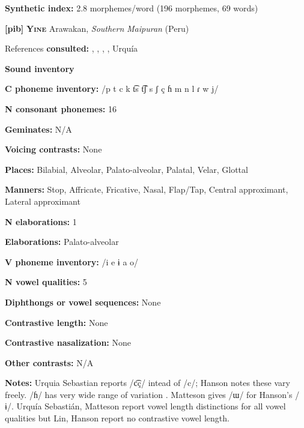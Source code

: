 \textbf{Synthetic index:} 2.8 morphemes/word (196 morphemes, 69 words)



\textbf{[pib]}   \textbf{\textsc{Yine}}  Arawakan, \textit{Southern} \textit{Maipuran} (Peru)



References \textbf{consulted:} \citet{Hanson2010}, \citet{Lin1997}, \citet{Matteson1965}, \citet{Parker1989}, Urquía \citet{SebastiánMarlett2008}



\textbf{Sound inventory}



\textbf{C phoneme inventory:} /p t c k t͡s t͡ʃ s ʃ ç ɦ m n l ɾ w j/



\textbf{N consonant phonemes:} 16



\textbf{Geminates:} N/A



\textbf{Voicing contrasts:} None



\textbf{Places:} Bilabial, Alveolar, Palato-alveolar, Palatal, Velar, Glottal



\textbf{Manners:} Stop, Affricate, Fricative, Nasal, Flap/Tap, Central approximant, Lateral approximant



\textbf{N elaborations:} 1



\textbf{Elaborations:} Palato-alveolar



\textbf{V phoneme inventory:} /i e ɨ a o/



\textbf{N vowel qualities:} 5



\textbf{Diphthongs or vowel sequences:} None



\textbf{Contrastive length:} None



\textbf{Contrastive nasalization:} None



\textbf{Other contrasts:} N/A



\textbf{Notes:} Urquia Sebastian reports /c͡ç/ intead of /c/; Hanson notes these vary freely. /ɦ/ has very wide range of variation \citep[20-23]{Hanson2010}. Matteson gives /ɯ/ for Hanson’s /ɨ/. Urquía Sebastián, Matteson report vowel length distinctions for all vowel qualities but Lin, Hanson report no contrastive vowel length.



